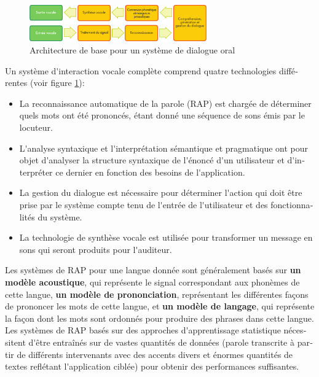 \begin{french}
\begin{multicols}{2}
\begin{figure}[!ht]
\begin{center}
 \includegraphics[width=3.0in]{../_media/french/simple_speech-based_dialogue_architecture} 
\caption{Architecture de base pour un système de dialogue oral}
\label{fig:slds}
\end{center}
\end{figure}

Un système d{\mbox '}interaction vocale complète comprend quatre technologies
différentes (voir figure \ref{fig:slds}):
\begin{itemize}
\item La reconnaissance automatique de la parole (RAP) est chargée de
  déterminer quels mots ont été prononcés, étant donné une
  séquence de sons émis par le locuteur.
\item L{\mbox '}analyse syntaxique et l{\mbox '}interprétation sémantique et
  pragmatique ont pour objet d{\mbox '}analyser la structure syntaxique de
  l{\mbox '}énoncé d{\mbox '}un utilisateur et d{\mbox '}interpréter ce dernier en fonction
  des besoins de l{\mbox '}application.
\item La gestion du dialogue est nécessaire pour déterminer l{\mbox '}action
  qui doit être prise par le système compte tenu de l{\mbox '}entrée de
  l{\mbox '}utilisateur et des fonctionnalités du système.
\item La technologie de synthèse vocale est utilisée pour transformer
  un message en sons qui seront produits pour l{\mbox '}auditeur.
\end{itemize}

Les systèmes de RAP pour une langue donnée sont généralement basés sur
{\bf un modèle acoustique}, qui représente le signal correspondant aux
phonèmes de cette langue, {\bf un modèle de prononciation},
représentant les différentes façons de prononcer les mots de cette
langue, et {\bf un modèle de langage}, qui représente la façon dont
les mots sont ordonnés pour produire des phrases dans cette
langue. Les systèmes de RAP basés sur des approches d{\mbox
  '}apprentissage statistique nécessitent d{\mbox '}être entraînés sur
de vastes quantités de données (parole transcrite à partir de
différents intervenants avec des accents divers et énormes quantités
de textes reflétant l{\mbox '}application ciblée) pour obtenir des
performances suffisantes.


\end{multicols}
\end{french}
